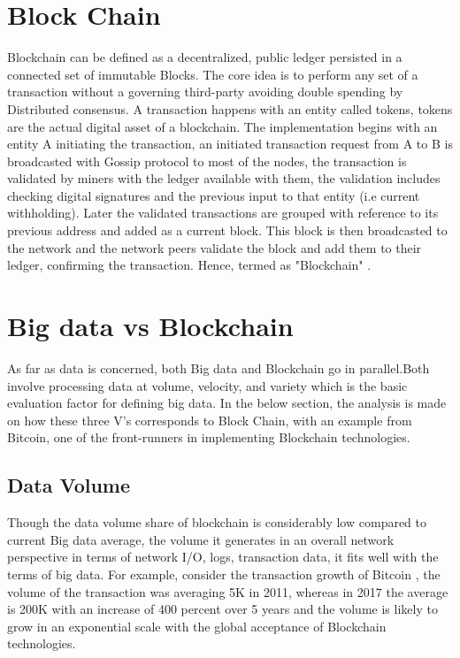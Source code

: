 \documentclass[sigconf]{acmart}
\begin{document}
\section{Block Chain}

 Blockchain can be defined as a decentralized, public ledger persisted in a connected set of immutable Blocks. The core idea is to perform any set of a transaction without a governing third-party avoiding double spending by Distributed consensus. A transaction happens with an entity called tokens, tokens are the actual digital asset of a blockchain. The implementation begins with an entity A initiating the transaction, an initiated transaction request from A to B is broadcasted with Gossip protocol to most of the nodes, the transaction is validated by miners with the ledger available with them, the validation includes checking digital signatures and the previous input to that entity (i.e current withholding). Later the validated transactions are grouped with reference to its previous address and added as a current block. This block is then broadcasted to the network and the network peers validate the block and add them to their ledger, confirming the transaction. Hence, termed as "Blockchain" \cite{Bitcoin}.

\section{Big data vs Blockchain}
As far as data is concerned, both Big data and Blockchain go in parallel.Both involve processing data at volume, velocity, and variety which is the basic evaluation factor for defining big data. In the below section, the analysis is made on how these three V's corresponds to Block Chain, with an example from Bitcoin, one of the front-runners in implementing Blockchain technologies.

\subsection{Data Volume}
Though the data volume share of blockchain is considerably low compared to current Big data average, the volume it generates in an overall network perspective in terms of network I/O, logs, transaction data, it fits well with the terms of big data. For example, consider the transaction growth of Bitcoin \cite{bitcointrans}, the volume of the transaction was averaging 5K in 2011, whereas in 2017 the average is 200K with an increase of 400 percent over 5 years and the volume is likely to grow in an exponential scale with the global acceptance of Blockchain technologies. 
\end{document}
